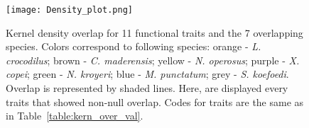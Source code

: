 \begin{figure} [!htbp]
	\begin{center}
		\texttt{[image: Density\_plot.png]}
	\end{center}
	\caption[Kernel density distribution of overlapping species]{Kernel density overlap for 11 functional traits and the 7 overlapping species. Colors correspond to following species: orange - \textit{L. crocodilus}; brown - \textit{C. maderensis}; yellow - \textit{N. operosus}; purple - \textit{X. copei}; green - \textit{N. kroyeri}; blue - \textit{M. punctatum}; grey - \textit{S. koefoedi}. Overlap is represented by shaded lines. Here, are displayed every traits that showed non-null overlap. Codes for traits are the same as in Table~\ref{table:kern_over_val}.}
	\label{fig:dpo}
\end{figure}